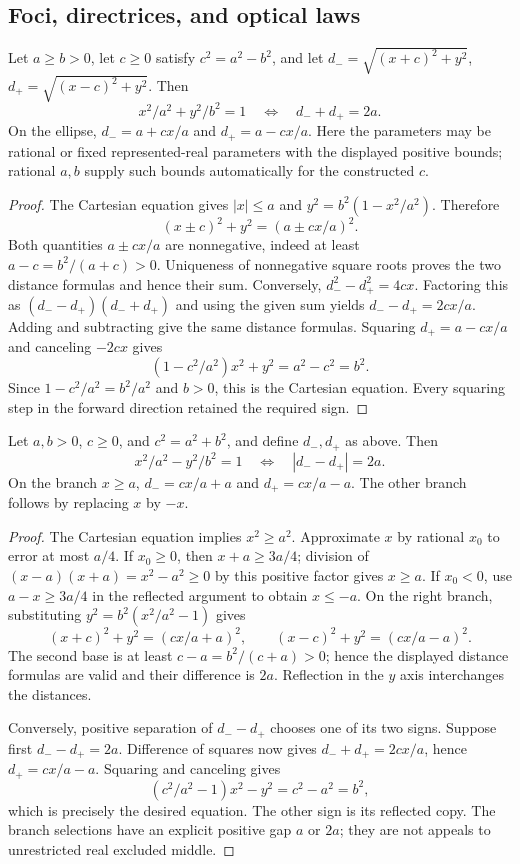 \subsection{Foci, directrices, and optical laws}

\begin{theorem}\label{con:ellipse-foci}
Let $a\ge b>0$, let $c\ge0$ satisfy $c^2=a^2-b^2$, and let
$d_-=\sqrt{(x+c)^2+y^2}$, $d_+=\sqrt{(x-c)^2+y^2}$.
Then
\[
 x^2/a^2+y^2/b^2=1\quad\Longleftrightarrow\quad d_-+d_+=2a.
\]
On the ellipse, $d_-=a+cx/a$ and $d_+=a-cx/a$.
Here the parameters may be rational or fixed represented-real parameters
with the displayed positive bounds; rational $a,b$ supply such bounds
automatically for the constructed $c$.
\end{theorem}
\begin{proof}
The Cartesian equation gives $|x|\le a$ and
$y^2=b^2(1-x^2/a^2)$. Therefore
\[
 (x\pm c)^2+y^2=(a\pm cx/a)^2.
\]
Both quantities $a\pm cx/a$ are nonnegative, indeed at least
$a-c=b^2/(a+c)>0$. Uniqueness of nonnegative square roots proves the
two distance formulas and hence their sum. Conversely,
$d_-^2-d_+^2=4cx$. Factoring this as
$(d_--d_+)(d_-+d_+)$ and using the given sum yields
$d_--d_+=2cx/a$. Adding and subtracting give the same distance
formulas. Squaring $d_+=a-cx/a$ and canceling $-2cx$ gives
\[
 (1-c^2/a^2)x^2+y^2=a^2-c^2=b^2.
\]
Since $1-c^2/a^2=b^2/a^2$ and $b>0$, this is the Cartesian equation.
Every squaring step in the forward direction retained the required sign.
\end{proof}

\begin{theorem}\label{con:hyperbola-foci}
Let $a,b>0$, $c\ge0$, and $c^2=a^2+b^2$, and define $d_-,d_+$ as above.
Then
\[
 x^2/a^2-y^2/b^2=1\quad\Longleftrightarrow\quad |d_--d_+|=2a.
\]
On the branch $x\ge a$, $d_-=cx/a+a$ and $d_+=cx/a-a$.
The other branch follows by replacing $x$ by $-x$.
\end{theorem}
\begin{proof}
The Cartesian equation implies $x^2\ge a^2$. Approximate $x$ by rational
$x_0$ to error at most $a/4$. If $x_0\ge0$, then $x+a\ge3a/4$;
division of $(x-a)(x+a)=x^2-a^2\ge0$ by this positive factor gives
$x\ge a$. If $x_0<0$, use $a-x\ge3a/4$ in the reflected argument
to obtain $x\le-a$. On the right branch, substituting
$y^2=b^2(x^2/a^2-1)$ gives
\[
 (x+c)^2+y^2=(cx/a+a)^2,\qquad
 (x-c)^2+y^2=(cx/a-a)^2.
\]
The second base is at least $c-a=b^2/(c+a)>0$; hence the displayed
distance formulas are valid and their difference is $2a$. Reflection
in the $y$ axis interchanges the distances.

Conversely, positive separation of $d_--d_+$ chooses one of its two
signs. Suppose first $d_--d_+=2a$. Difference of squares now gives
$d_-+d_+=2cx/a$, hence $d_+=cx/a-a$. Squaring and canceling gives
\[
 (c^2/a^2-1)x^2-y^2=c^2-a^2=b^2,
\]
which is precisely the desired equation. The other sign is its reflected
copy. The branch selections have an explicit positive gap $a$ or $2a$;
they are not appeals to unrestricted real excluded middle.
\end{proof}

